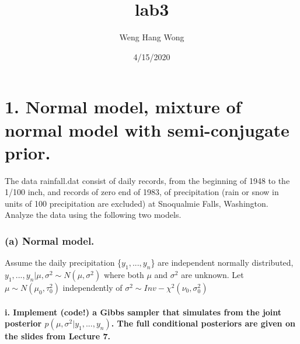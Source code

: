\documentclass[]{article}
\title{lab3}
\author{Weng Hang Wong}
\date{4/15/2020}
\let\oldparagraph\paragraph
\renewcommand{\paragraph}[1]{\oldparagraph{#1}\mbox{}}
\begin{document}
\maketitle

\hypertarget{normal-model-mixture-of-normal-model-with-semi-conjugate-prior.}{%
\section{1. Normal model, mixture of normal model with semi-conjugate
prior.}\label{normal-model-mixture-of-normal-model-with-semi-conjugate-prior.}}

The data rainfall.dat consist of daily records, from the beginning of
1948 to the 1/100 inch, and records of zero end of 1983, of
precipitation (rain or snow in units of 100 precipitation are excluded)
at Snoqualmie Falls, Washington. Analyze the data using the following
two models.

\hypertarget{a-normal-model.}{%
\subsubsection{(a) Normal model.}\label{a-normal-model.}}

Assume the daily precipitation \{\(y_1, ..., y_n\)\} are independent
normally distributed,
\(y_1,..., y_n |\mu,\sigma^2 \sim N(\mu,\sigma^2)\) where both \(\mu\)
and \(\sigma^2\) are unknown. Let \(\mu \sim N(\mu_0, \tau_0^2 )\)
independently of \(\sigma^2 \sim Inv- \chi^2(\nu_0,\sigma_0^2)\)

\hypertarget{i.-implement-code-a-gibbs-sampler-that-simulates-from-the-joint-posterior-pmu-sigma2-y_1-...-y_n-.-the-full-conditional-posteriors-are-given-on-the-slides-from-lecture-7.}{%
\paragraph{\texorpdfstring{i. Implement (code!) a Gibbs sampler that
simulates from the joint posterior
\(p(\mu, \sigma^2 |y_1 , ..., y_n )\). The full conditional posteriors
are given on the slides from Lecture
7.}{i. Implement (code!) a Gibbs sampler that simulates from the joint posterior p(\textbackslash mu, \textbackslash sigma\^{}2 \textbar y\_1 , ..., y\_n ). The full conditional posteriors are given on the slides from Lecture 7.}}\label{i.-implement-code-a-gibbs-sampler-that-simulates-from-the-joint-posterior-pmu-sigma2-y_1-...-y_n-.-the-full-conditional-posteriors-are-given-on-the-slides-from-lecture-7.}}
\end{document}
